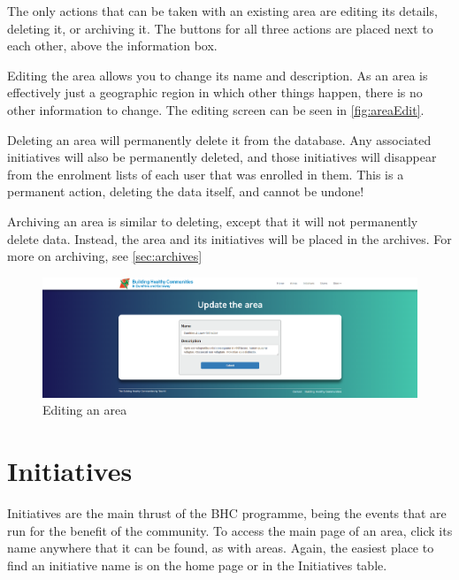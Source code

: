 \documentclass{bhcguides}
\begin{document}
The only actions that can be taken with an existing area are editing its details, deleting it, or archiving it. The buttons for all three actions are placed next to each other, above the information box.

Editing the area allows you to change its name and description. As an area is effectively just a geographic region in which other things happen, there is no other information to change. The editing screen can be seen in \autoref{fig:areaEdit}.

Deleting an area will permanently delete it from the database. Any associated initiatives will also be permanently deleted, and those initiatives will disappear from the enrolment lists of each user that was enrolled in them. This is a permanent action, deleting the data itself, and cannot be undone!

Archiving an area is similar to deleting, except that it will not permanently delete data. Instead, the area and its initiatives will be placed in the archives. For more on archiving, see \autoref{sec:archives}

\begin{figure}[h!]
 \centerline{\includegraphics[width=\textwidth, height=\textheight, keepaspectratio]{areaedit.png}}
 \caption{Editing an area}
 \label{fig:areaEdit}
\end{figure}

\pagebreak

\section{Initiatives}
\label{sec:initiatives}

Initiatives are the main thrust of the BHC programme, being the events that are run for the benefit of the community. To access the main page of an area, click its name anywhere that it can be found, as with areas. Again, the easiest place to find an initiative name is on the home page or in the Initiatives table.
\end{document}
